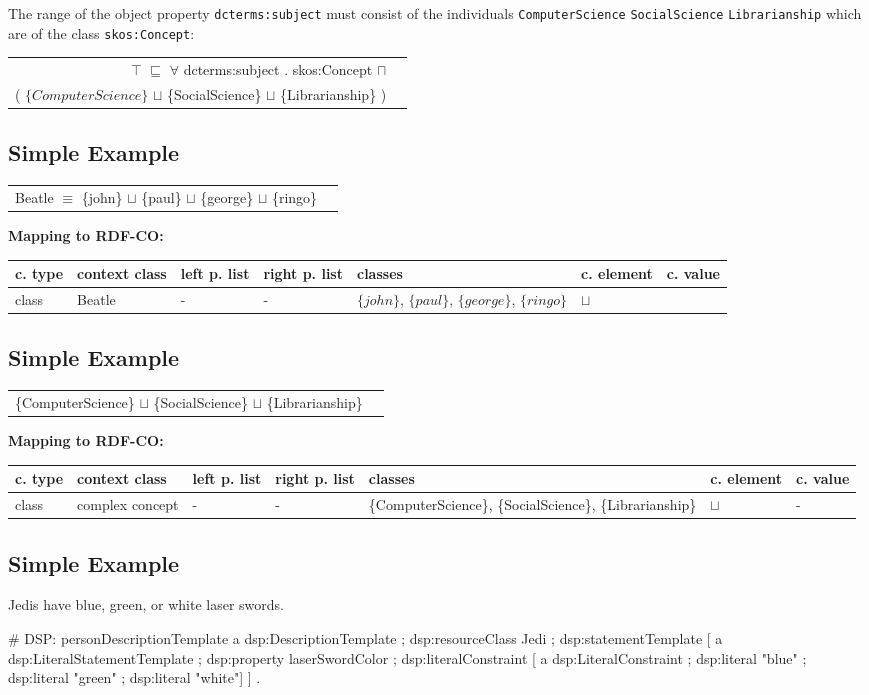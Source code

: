 \documentclass{llncs}
\newcommand{\ms}[1]{\texttt{#1}}
\newenvironment{gcotable}{
  \scriptsize
  \sffamily
  \vspace{0cm}
	\begin{center}
	\textbf{\vspace{0.4cm}Mapping to RDF-CO:} \\
  \begin{tabular}{l|l|l|l|l|l|l}
	\hline
  \textbf{c. type} & \textbf{context class} & \textbf{left p. list} & \textbf{right p. list} & \textbf{classes} & \textbf{c. element} & \textbf{c. value} \\
  \hline

}{
  \hline
  \end{tabular}
	\end{center}
}
\newenvironment{DL}{
  \vspace{0cm}
	\begin{center}
  \begin{tabular}{r l}

}{
  \end{tabular}
	\end{center}
}
\begin{document}
The range of the object property \ms{dcterms:subject} must consist of the individuals \ms{ComputerScience} \ms{SocialScience} \ms{Librarianship} which are of the class \ms{skos:Concept}:

\begin{DL}
$\top$ $\sqsubseteq$ $\forall$ dcterms:subject . skos:Concept $\sqcap$ \\
( $\{ComputerScience\}$ $\sqcup$ \{SocialScience\} $\sqcup$ \{Librarianship\} ) \\
\end{DL}

\subsection{Simple Example}

\begin{DL}
Beatle $\equiv$ \{john\} $\sqcup$ \{paul\} $\sqcup$ \{george\} $\sqcup$ \{ringo\} \\
\end{DL}

\begin{gcotable}
class & Beatle & - & - & $\{john\}$, $\{paul\}$, $\{george\}$, $\{ringo\}$ & $\sqcup$ \\
\end{gcotable}

\subsection{Simple Example}

\begin{DL}
\{ComputerScience\} $\sqcup$ \{SocialScience\} $\sqcup$ \{Librarianship\} \\
\end{DL}

\begin{gcotable}
class & complex concept & - & - & \{ComputerScience\}, \{SocialScience\}, \{Librarianship\} & $\sqcup$ & - \\
\end{gcotable}

\subsection{Simple Example}

Jedis have blue, green, or white laser swords.

\begin{ex}
# DSP:
personDescriptionTemplate
    a dsp:DescriptionTemplate ;
    dsp:resourceClass Jedi ;
    dsp:statementTemplate [
        a dsp:LiteralStatementTemplate ;
        dsp:property laserSwordColor ;
        dsp:literalConstraint [
            a dsp:LiteralConstraint ;
            dsp:literal "blue" ;
            dsp:literal "green" ;
            dsp:literal "white"] ] .
\end{ex}
\end{document}
